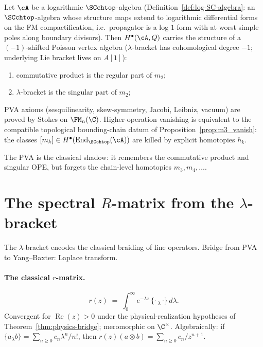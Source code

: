 \begin{maintheorem}
\label{thm:intro-PVA-descent}
Let $\cA$ be a logarithmic $\SCchtop$-algebra
\textup{(}Definition~\textup{\ref{def:log-SC-algebra}}: an
$\SCchtop$-algebra whose structure maps extend to logarithmic
differential forms on the FM compactification, i.e.\ propagator
is a log $1$-form with at worst simple poles along boundary
divisors\textup{)}. Then $H^\bullet(\cA, Q)$ carries the
structure of a $(-1)$-shifted Poisson vertex algebra
($\lambda$-bracket has cohomological degree $-1$; underlying Lie
bracket lives on $A[1]$):
\begin{enumerate}[label=\textup{(\roman*)}]
\item commutative product is the regular part of $m_2$;
\item $\lambda$-bracket is the singular part of $m_2$;
\end{enumerate}
PVA axioms (sesquilinearity, skew-symmetry, Jacobi, Leibniz,
vacuum) are proved by Stokes on $\FM_n(\C)$. Higher-operation
vanishing is equivalent to the compatible topological
bounding-chain datum of Proposition~\ref{prop:m3_vanish}: the
classes $[m_k]\in H^\bullet(\operatorname{End}_{\SCchtop}(\cA))$
are killed by explicit homotopies $h_k$.
\end{maintheorem}

The PVA is the classical shadow: it remembers the commutative
product and singular OPE, but forgets the chain-level homotopies
$m_3, m_4, \ldots$.

\section*{The spectral $R$-matrix from the $\lambda$-bracket}

The $\lambda$-bracket encodes the classical braiding of line
operators. Bridge from PVA to Yang--Baxter: Laplace transform.

\paragraph{The classical $r$-matrix.}
\begin{equation}
\label{eq:intro-laplace}
r(z) \;=\; \int_0^\infty e^{-\lambda z}\,
\{{\cdot}\,{}_\lambda\,{\cdot}\}\, d\lambda.
\end{equation}
Convergent for $\operatorname{Re}(z) > 0$ under the
physical-realization hypotheses of
Theorem~\ref{thm:physics-bridge}; meromorphic on $\C^\times$.
Algebraically: if $\{a {}_\lambda b\} = \sum_{n \ge 0} c_n \lambda^n / n!$,
then $r(z)(a \otimes b) = \sum_{n \ge 0} c_n / z^{n+1}$.

